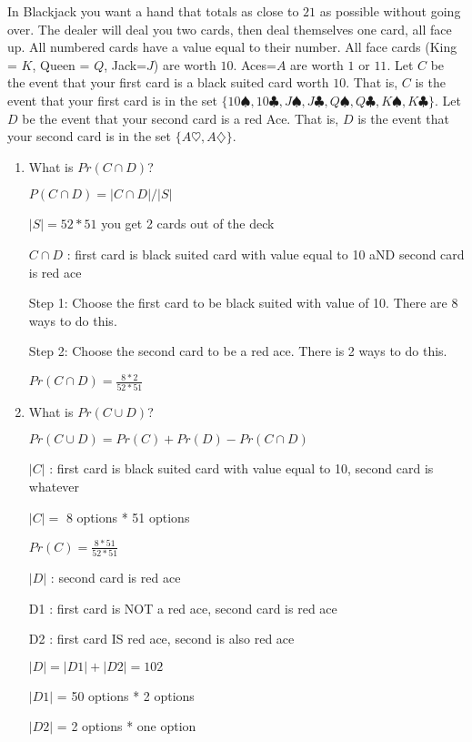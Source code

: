 \documentclass[12pt]{article}
\newcounter{ques}
\newenvironment{question}{\stepcounter{ques}{\noindent\bf Question \arabic{ques}:}}{\vspace{5mm}}
\begin{document}
\begin{question}
	In Blackjack you want a hand that totals as close to $21$ as possible without going over. The dealer will deal you two cards, then deal themselves one card, all face up. All numbered cards have a value equal to their number. All face cards (King = $K$, Queen = $Q$, Jack=$J$) are worth $10$. Aces=$A$ are worth $1$ or $11$. Let $C$ be the event that your first card is a black suited card worth $10$. That is, $C$ is the event that your first card is in the set $\{10\spadesuit, 10\clubsuit, J\spadesuit, J\clubsuit, Q\spadesuit, Q\clubsuit, K\spadesuit, K\clubsuit\}$. Let $D$ be the event that your second card is a red Ace. That is, $D$ is the event that your second card is in the set $\{A\heartsuit, A\diamondsuit\}$.
	
	\begin{enumerate}
		\item What is $Pr(C\cap D)$?
		
		$P(C \cap D) = |C \cap D| / |S|$

		$|S| = 52 * 51$ you get 2 cards out of the deck

		$C \cap D$ : first card is black suited card with value equal to 10 aND second card is red ace

		Step 1: Choose the first card to be black suited with value of 10. There are 8 ways to do this.

		Step 2: Choose the second card to be a red ace. There is 2 ways to do this.

		$Pr(C \cap D) = \frac{8*2}{52*51}$

		\item What is $Pr(C\cup D)$?
		
		$Pr(C\cup D) = Pr(C) + Pr(D) - Pr(C \cap D)$

		$|C|$ : first card is black suited card with value equal to 10, second card is whatever

		$|C| =$ 8 options * 51 options

		$Pr(C) = \frac{8*51}{52*51}$ 

		$|D|$ : second card is red ace

		D1 : first card is NOT a red ace, second card is red ace

		D2 : first card IS red ace, second is also red ace

		$|D| = |D1| + |D2| = 102$

		$|D1|$ = 50 options * 2 options

		$|D2|$ = 2 options * one option


\end{enumerate}
\end{question}
\end{document}
